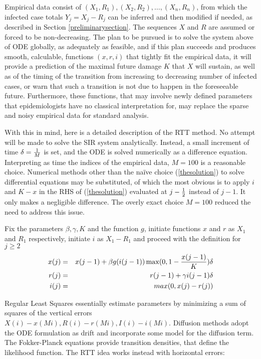 \documentclass{article}
\begin{document}
Empirical data consist of $(X_1,R_1), (X_2,R_2), \dots, (X_n, R_n)$, from which the infected case totals $Y_j=X_j-R_j$ can be inferred and then modified if needed, as described in Section \ref{preliminarysection}. 
The sequences $X$ and $R$ are assumed or forced to be non-decreasing.
The plan to be pursued is to solve the system above of ODE globally, as adequately as feasible, and if this plan succeeds and produces smooth, calculable, functions $(x,r,i)$ that tightly fit the empirical data, it will provide a prediction of the maximal future damage $K$ that $X$ will sustain, as well as of the timing of the transition from increasing to decreasing number of infected cases, or warn that such a transition is not due to happen in the foreseeable future. Furthermore, these functions, that may involve newly defined parameters that epidemiologists have no classical interpretation for, may replace the sparse and noisy empirical data for standard analysis.

With this in mind, here is a detailed description of the RTT method. No attempt will be made to solve the SIR system analytically. Instead, a small increment of time $\delta={1 \over M}$ is set, and the ODE is solved numerically as a difference equation. Interpreting as time the indices of the empirical data, $M=100$ is a reasonable choice. Numerical methods other than the na\"{i}ve choice (\ref{thesolution}) to solve differential equations may be substituted, of which the most obvious is to apply $i$ and $K-x$ in the RHS of (\ref{thesolution}) evaluated at $j-{1 \over 2}$ instead of $j-1$. It only makes a negligible difference. The overly exact choice $M=100$ reduced the need to address this issue.

\bigskip

Fix the parameters $\beta, \gamma, K$ and the function $g$, initiate functions $x$ and $r$ as $X_1$ and $R_1$ respectively, initiate $i$ as $X_1-R_1$ and proceed with the definition for $j \ge 2$
\begin{eqnarray}
x(j)&=&x(j-1)+\beta g(i(j-1))\max(0,1-{{x(j-1)} \over K}) \delta \nonumber \\
r(j)&=&r(j-1)+\gamma i(j-1) \delta \nonumber \\
i(j)&=&max(0,x(j)-r(j)) \label{thesolution}
\end{eqnarray}

Regular Least Squares essentially estimate parameters by minimizing a sum of squares of the vertical errors $X(i)-x(M i), R(i)-r(M i), I(i)-i(M i)$. Diffusion methods adopt the ODE formulation as drift and incorporate some model for the diffusion term. The Fokker-Planck equations provide transition densities, that define the likelihood function.
The RTT idea works instead with horizontal errors:
\end{document}
